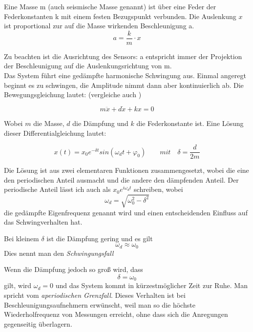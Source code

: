 \documentclass[12pt,a4paper]{scrartcl}
\begin{document}
Eine Masse m (auch seismische Masse genannt) ist über eine Feder der Federkonstanten k mit einem festen Bezugspunkt verbunden. Die Auslenkung $x$ ist proportional zur auf die Masse wirkenden Beschleunigung a.
\begin{equation}
a = \frac{k}{m} \cdot x
\end{equation}

Zu beachten ist die Ausrichtung des Sensors: a entspricht immer der Projektion der Beschleunigung auf die Auslenkungsrichtung von m.\\

Das System führt eine gedämpfte harmonische Schwingung aus. Einmal angeregt beginnt es zu schwingen, die Amplitude nimmt dann aber kontinuierlich ab. Die Bewegungsgleichung lautet: (vergleiche auch \citep{Meschede:2001fk})

\begin{equation}
m \ddot x + d \dot x + kx = 0
\end{equation}

Wobei $m$ die Masse, $d$ die Dämpfung und $k$ die Federkonstante ist.
Eine Lösung dieser Differentialgleichung lautet:

\begin{equation}
x(t) = x_0 e^{-\delta t} sin(\omega_d t + \varphi_0) \qquad mit \quad \delta = \frac{d}{2m}
\end{equation}

Die Lösung ist aus zwei elementaren Funktionen zusammengesetzt, wobei die eine den periodischen Anteil ausmacht und die andere den dämpfenden Anteil. Der periodische Anteil lässt ich auch als $x_0 e^{i\omega_d t}$ schreiben, wobei 
\begin{equation}
\omega_d = \sqrt{\omega_0^2 - \delta^2}
\end{equation}
die gedämpfte Eigenfrequenz genannt wird und einen entscheidenden Einfluss auf das Schwingverhalten hat.

Bei kleinem $\delta$ ist die Dämpfung gering und es gilt
\begin{equation}
\omega_d \approx \omega_0
\end{equation}
Dies nennt man den \textit{Schwingungsfall}

Wenn die Dämpfung jedoch so groß wird, dass
\begin{equation}
\delta = \omega_0
\end{equation}
gilt, wird $\omega_d = 0$ und das System kommt in kürzestmöglicher Zeit zur Ruhe. Man spricht vom \textit{aperiodischen Grenzfall}. Dieses Verhalten ist bei Beschleunigungsaufnehmern erwünscht, weil man so die höchste Wiederholfrequenz von Messungen erreicht, ohne dass sich die Anregungen gegenseitig überlagern.\\
\end{document}
